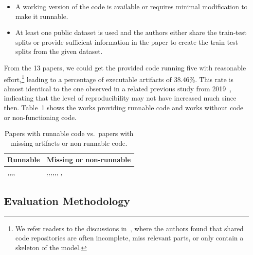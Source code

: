\documentclass[sigconf,natbib=true,nonacm]{acmart}
\begin{document}
\begin{itemize}
    \item A working version of the code is available or requires minimal modification to make it runnable.
    \item At least one public dataset is used and the authors either share the train-test splits or provide sufficient information in the paper to create the train-test splits from the given dataset.
\end{itemize}

From the 13 papers, we could get the provided code running five with reasonable effort,\footnote{We refer readers to the discussions in~\cite{ferraridacremaetal2019}, where the authors found that shared code repositories are often incomplete, miss relevant parts, or only contain a skeleton of the model.} leading to a  percentage of executable artifacts of 38.46\%. This rate is almost identical to the one observed in a related previous study from 2019~\cite{ferraridacremaetal2019}, indicating that the level of reproducibility may not have increased much since then. Table~\ref{tab:reproduciblity} shows the works providing runnable code and works without code or non-functioning code.



\begin{table}[htbp]
    \caption{Papers with runnable code vs.~papers with missing artifacts or non-runnable code.}
    \label{tab:reproduciblity}
    \centering
    \begin{tabular}{p{3cm}p{3.5cm}}
    Runnable & Missing or non-runnable \\ \hline
    \cite{qian2022intent},\cite{wang2020disentangled},\cite{ren2023disentangled},\cite{zhang2024exploring},\cite{wang2021learning}  & \cite{hu2020graph},\cite{wu2023intent},\cite{li2023topic},\cite{li2023entity},\cite{zhang2023fire},\cite{ma2019learning}, \cite{liu2020octopus},\cite{yang2019intention}
    \end{tabular}
\end{table}



\subsection{Evaluation Methodology}
\end{document}
